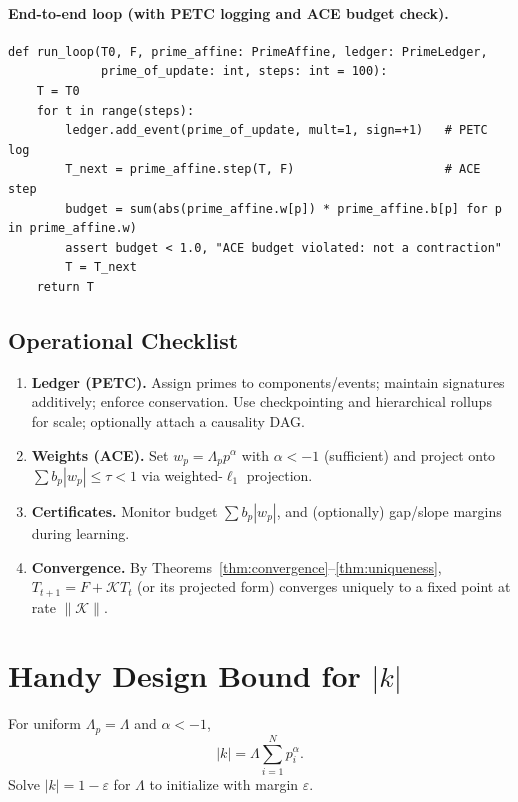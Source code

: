 \documentclass[11pt]{article}
\theoremstyle{definition}
\theoremstyle{remark}
\newcommand{\1}{\mathbf{1}}
\begin{document}
\paragraph{End-to-end loop (with PETC logging and ACE budget check).}
\begin{verbatim}
def run_loop(T0, F, prime_affine: PrimeAffine, ledger: PrimeLedger,
             prime_of_update: int, steps: int = 100):
    T = T0
    for t in range(steps):
        ledger.add_event(prime_of_update, mult=1, sign=+1)   # PETC log
        T_next = prime_affine.step(T, F)                     # ACE step
        budget = sum(abs(prime_affine.w[p]) * prime_affine.b[p] for p in prime_affine.w)
        assert budget < 1.0, "ACE budget violated: not a contraction"
        T = T_next
    return T
\end{verbatim}

\subsection{Operational Checklist}
\begin{enumerate}
  \item \textbf{Ledger (PETC).} Assign primes to components/events; maintain signatures additively; enforce conservation. Use checkpointing and hierarchical rollups for scale; optionally attach a causality DAG.
  \item \textbf{Weights (ACE).} Set $w_p=\Lambda_p p^\alpha$ with $\alpha< -1$ (sufficient) and project onto $\sum b_p|w_p|\le\tau<1$ via weighted-$\ell_1$ projection.
  \item \textbf{Certificates.} Monitor budget $\sum b_p|w_p|$, and (optionally) gap/slope margins during learning.
  \item \textbf{Convergence.} By Theorems~\ref{thm:convergence}–\ref{thm:uniqueness}, $T_{t+1}=F+\mathcal{K}T_t$ (or its projected form) converges uniquely to a fixed point at rate $\|\mathcal{K}\|$.
\end{enumerate}

\appendix
\section{Handy Design Bound for $|k|$}\label{app:design-bound}
For uniform $\Lambda_p=\Lambda$ and $\alpha<-1$,
\begin{equation*}
  |k|=\Lambda \sum_{i=1}^{N}p_i^{\alpha}.
\end{equation*}
Solve $|k|=1-\varepsilon$ for $\Lambda$ to initialize with margin $\varepsilon$.
\end{document}
